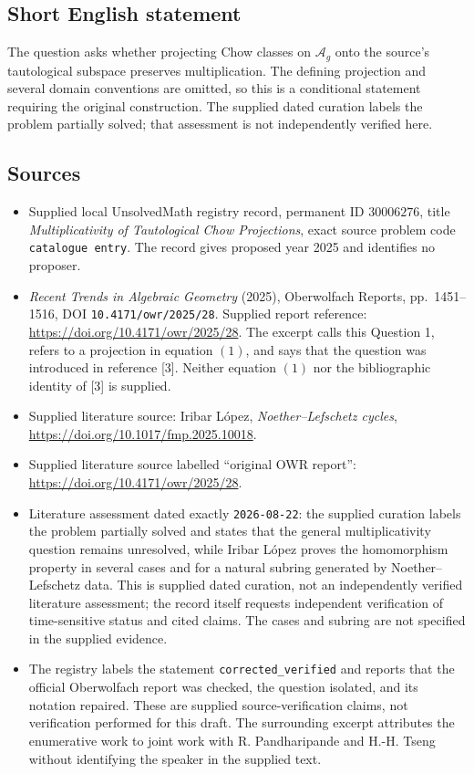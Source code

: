 \documentclass[11pt]{article}
\begin{document}
\subsection{Short English statement}
The question asks whether projecting Chow classes on \(\mathcal A_g\) onto the source's tautological subspace preserves multiplication. The defining projection and several domain conventions are omitted, so this is a conditional statement requiring the original construction. The supplied dated curation labels the problem partially solved; that assessment is not independently verified here.
\subsection{Sources}
\begin{itemize}
\item Supplied local UnsolvedMath registry record, permanent ID \(30006276\), title \emph{Multiplicativity of Tautological Chow Projections}, exact source problem code \texttt{catalogue entry}. The record gives proposed year 2025 and identifies no proposer.
\item \emph{Recent Trends in Algebraic Geometry} (2025), Oberwolfach Reports, pp.\ 1451--1516, DOI \texttt{10.4171/owr/2025/28}. Supplied report reference: \url{https://doi.org/10.4171/owr/2025/28}. The excerpt calls this Question 1, refers to a projection in equation \((1)\), and says that the question was introduced in reference [3]. Neither equation \((1)\) nor the bibliographic identity of [3] is supplied.
\item Supplied literature source: Iribar L\'opez, \emph{Noether--Lefschetz cycles}, \url{https://doi.org/10.1017/fmp.2025.10018}.
\item Supplied literature source labelled ``original OWR report'': \url{https://doi.org/10.4171/owr/2025/28}.
\item Literature assessment dated exactly \texttt{2026-08-22}: the supplied curation labels the problem partially solved and states that the general multiplicativity question remains unresolved, while Iribar L\'opez proves the homomorphism property in several cases and for a natural subring generated by Noether--Lefschetz data. This is supplied dated curation, not an independently verified literature assessment; the record itself requests independent verification of time-sensitive status and cited claims. The cases and subring are not specified in the supplied evidence.
\item The registry labels the statement \texttt{corrected\_verified} and reports that the official Oberwolfach report was checked, the question isolated, and its notation repaired. These are supplied source-verification claims, not verification performed for this draft. The surrounding excerpt attributes the enumerative work to joint work with R. Pandharipande and H.-H. Tseng without identifying the speaker in the supplied text.
\end{itemize}
\end{document}
